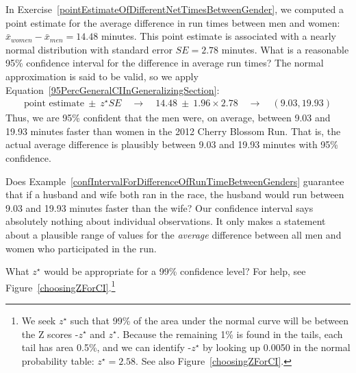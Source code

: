 \begin{example}{In Exercise~\vref{pointEstimateOfDifferentNetTimesBetweenGender}, we computed a point estimate for the average difference in run times between men and women: $\bar{x}_{women}-\bar{x}_{men}=14.48$ minutes. This point estimate is associated with a nearly normal distribution with standard error $SE=2.78$ minutes. What is a reasonable 95\% confidence interval for the difference in average run times?}
\label{confIntervalForDifferenceOfRunTimeBetweenGenders}
The normal approximation is said to be valid, so we apply Equation~\eqref{95PercGeneralCIInGeneralizingSection}:
\begin{eqnarray*}
\text{point estimate}\ \pm\ z^{\star} SE
	\quad\rightarrow\quad 14.48\ \pm\ 1.96\times 2.78
	\quad\rightarrow\quad (9.03, 19.93)
\end{eqnarray*}
Thus, we are 95\% confident that the men were, on average, between 9.03 and 19.93 minutes faster than women in the 2012 Cherry Blossom Run. That is, the actual average difference is plausibly between 9.03 and 19.93 minutes with 95\% confidence.
\end{example}


\begin{example}{Does Example~\ref{confIntervalForDifferenceOfRunTimeBetweenGenders} guarantee that if a husband and wife both ran in the race, the husband would run between 9.03 and 19.93 minutes faster than the wife?}
Our confidence interval says absolutely nothing about individual observations. It {only} makes a statement about a plausible range of values for the \emph{average} difference between all men and women who participated in the run.
\end{example}

\begin{exercise} \label{findZFor99PercConfLevelInFrameworkForInf}
What $z^{\star}$ would be appropriate for a 99\% confidence level? For help, see Figure~\vref{choosingZForCI}.\footnote{We seek $z^{\star}$ such that 99\% of the area under the normal curve will be between the Z scores -$z^{\star}$ and $z^{\star}$. Because the remaining 1\% is found in the tails, each tail has area 0.5\%, and we can identify -$z^{\star}$ by looking up 0.0050 in the normal probability table: $z^{\star} = 2.58$. See also Figure~\vref{choosingZForCI}.}
\end{exercise}


